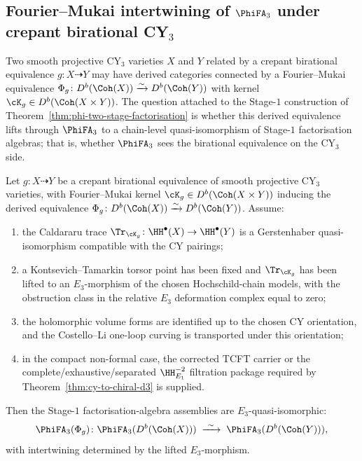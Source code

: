 \subsection{Fourier--Mukai intertwining of \texorpdfstring{$\PhiFA_3$}{Phi-FA-3} under crepant birational CY\texorpdfstring{$_3$}{-3}}
\label{subsec:cycat-crepant-fm-intertwining}

Two smooth projective CY$_3$ varieties $X$ and $Y$ related by a
crepant birational equivalence $g \colon X \dashrightarrow Y$ may have
derived categories connected by a Fourier--Mukai equivalence
$\Phi_g \colon D^b(\Coh(X)) \xrightarrow{\sim} D^b(\Coh(Y))$ with kernel
$\cK_g \in D^b(\Coh(X \times Y))$. The question attached to the Stage-$1$ construction of
Theorem~\ref{thm:phi-two-stage-factorisation} is whether this
derived equivalence lifts through $\PhiFA_3$ to a chain-level
quasi-isomorphism of Stage-$1$ factorisation algebras; that is,
whether $\PhiFA_3$ sees the birational equivalence on the CY$_3$ side.

\providecommand{\KM}{\mathrm{KM}}

\begin{theorem}
\label{thm:cycat-stage1-crepant-fm-intertwining}
Let $g \colon X \dashrightarrow Y$ be a crepant birational equivalence
of smooth projective CY$_3$ varieties, with Fourier--Mukai kernel
$\cK_g \in D^b(\Coh(X \times Y))$ inducing the derived equivalence
$\Phi_g \colon D^b(\Coh(X)) \xrightarrow{\sim} D^b(\Coh(Y))$. Assume:
\begin{enumerate}[label=(\roman*)]
 \item the Caldararu trace
 $\Tr_{\cK_g} \colon \HH^\bullet(X) \to \HH^\bullet(Y)$ is a
 Gerstenhaber quasi-isomorphism compatible with the CY pairings;
 \item a Kontsevich--Tamarkin torsor point has been fixed and
 $\Tr_{\cK_g}$ has been lifted to an $E_3$-morphism of the chosen
 Hochschild-chain models, with the obstruction class in the relative
 $E_3$ deformation complex equal to zero;
 \item the holomorphic volume forms are identified up to the chosen
 CY orientation, and the Costello--Li one-loop curving is transported
 under this orientation;
 \item in the compact non-formal case, the corrected TCFT carrier or
 the complete/exhaustive/separated $\HH^{-2}_{E_1}$ filtration package
 required by Theorem~\ref{thm:cy-to-chiral-d3} is supplied.
\end{enumerate}
Then the Stage-$1$ factorisation-algebra assemblies are
$E_3$-quasi-isomorphic:
\[
 \PhiFA_3(\Phi_g) \colon
 \PhiFA_3(D^b(\Coh(X)))
 \;\xrightarrow{\ \sim\ }\;
 \PhiFA_3(D^b(\Coh(Y))),
\]
with intertwining determined by the lifted $E_3$-morphism.
\end{theorem}

